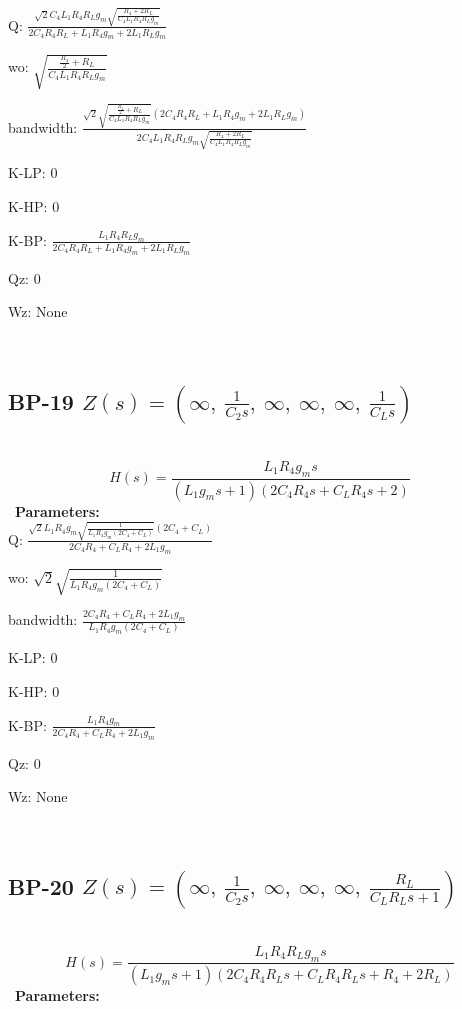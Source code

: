 \documentclass{article}
\begin{document}
Q: $\frac{\sqrt{2} C_{4} L_{1} R_{4} R_{L} g_{m} \sqrt{\frac{R_{4} + 2 R_{L}}{C_{4} L_{1} R_{4} R_{L} g_{m}}}}{2 C_{4} R_{4} R_{L} + L_{1} R_{4} g_{m} + 2 L_{1} R_{L} g_{m}}$\ 

wo: $\sqrt{\frac{\frac{R_{4}}{2} + R_{L}}{C_{4} L_{1} R_{4} R_{L} g_{m}}}$\ 

bandwidth: $\frac{\sqrt{2} \sqrt{\frac{\frac{R_{4}}{2} + R_{L}}{C_{4} L_{1} R_{4} R_{L} g_{m}}} \left(2 C_{4} R_{4} R_{L} + L_{1} R_{4} g_{m} + 2 L_{1} R_{L} g_{m}\right)}{2 C_{4} L_{1} R_{4} R_{L} g_{m} \sqrt{\frac{R_{4} + 2 R_{L}}{C_{4} L_{1} R_{4} R_{L} g_{m}}}}$\ 

K-LP: $0$\ 

K-HP: $0$\ 

K-BP: $\frac{L_{1} R_{4} R_{L} g_{m}}{2 C_{4} R_{4} R_{L} + L_{1} R_{4} g_{m} + 2 L_{1} R_{L} g_{m}}$\ 

Qz: $0$\ 

Wz: $\text{None}$\ 

\ 

\subsection{BP-19 $Z(s) = \left( \infty, \  \frac{1}{C_{2} s}, \  \infty, \  \infty, \  \infty, \  \frac{1}{C_{L} s}\right)$ } \ 
\textbf{\[H(s) = \frac{L_{1} R_{4} g_{m} s}{\left(L_{1} g_{m} s + 1\right) \left(2 C_{4} R_{4} s + C_{L} R_{4} s + 2\right)}\] } \ 
\textbf{Parameters:}\\ 

Q: $\frac{\sqrt{2} L_{1} R_{4} g_{m} \sqrt{\frac{1}{L_{1} R_{4} g_{m} \left(2 C_{4} + C_{L}\right)}} \left(2 C_{4} + C_{L}\right)}{2 C_{4} R_{4} + C_{L} R_{4} + 2 L_{1} g_{m}}$\ 

wo: $\sqrt{2} \sqrt{\frac{1}{L_{1} R_{4} g_{m} \left(2 C_{4} + C_{L}\right)}}$\ 

bandwidth: $\frac{2 C_{4} R_{4} + C_{L} R_{4} + 2 L_{1} g_{m}}{L_{1} R_{4} g_{m} \left(2 C_{4} + C_{L}\right)}$\ 

K-LP: $0$\ 

K-HP: $0$\ 

K-BP: $\frac{L_{1} R_{4} g_{m}}{2 C_{4} R_{4} + C_{L} R_{4} + 2 L_{1} g_{m}}$\ 

Qz: $0$\ 

Wz: $\text{None}$\ 

\ 

\subsection{BP-20 $Z(s) = \left( \infty, \  \frac{1}{C_{2} s}, \  \infty, \  \infty, \  \infty, \  \frac{R_{L}}{C_{L} R_{L} s + 1}\right)$ } \ 
\textbf{\[H(s) = \frac{L_{1} R_{4} R_{L} g_{m} s}{\left(L_{1} g_{m} s + 1\right) \left(2 C_{4} R_{4} R_{L} s + C_{L} R_{4} R_{L} s + R_{4} + 2 R_{L}\right)}\] } \ 
\textbf{Parameters:}\\ 
\end{document}
